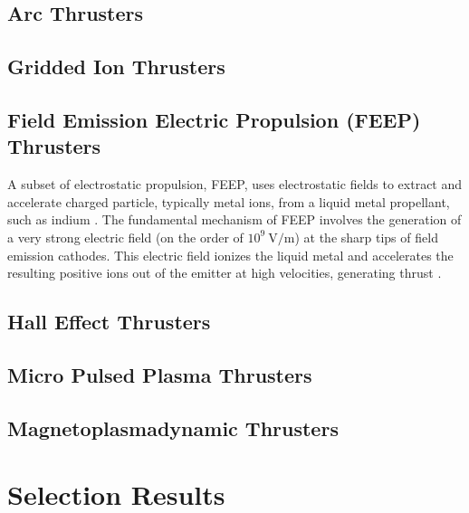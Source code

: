 \subsection{Arc Thrusters}

\subsection{Gridded Ion Thrusters}

\subsection{Field Emission Electric Propulsion (FEEP) Thrusters}

 A subset of electrostatic propulsion, FEEP, uses electrostatic fields to extract and accelerate charged particle, typically metal ions, from a liquid metal propellant, such as indium \cite{feep-plasma-propulsion}. The fundamental mechanism of FEEP involves the generation of a very strong electric field (on the order of $10^9~\mathrm{V/m}$) at the sharp tips of field emission cathodes. This electric field ionizes the liquid metal and accelerates the resulting positive ions out of the emitter at high velocities, generating thrust \cite{feep-general-tip-design}\cite{feep-ion-emitter-study}. 

\subsection{Hall Effect Thrusters}

\subsection{Micro Pulsed Plasma Thrusters}

\subsection{Magnetoplasmadynamic Thrusters}

\section{Selection Results}

